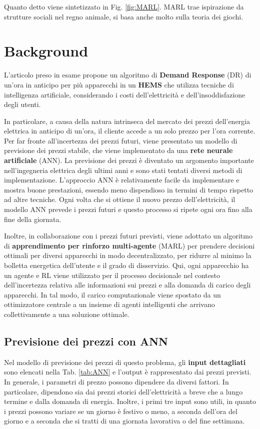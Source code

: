 \documentclass[italian, Lau, oneside]{sapthesis}
\begin{document}
Quanto detto viene sintetizzato in Fig. \ref{fig:MARL}. MARL trae ispirazione da strutture sociali nel regno animale, si basa anche molto sulla teoria dei giochi. 



\chapter{Background}
\label{cap:3}
L'articolo preso in esame \cite{ref:article} propone un algoritmo di \textbf{Demand Response} (DR) di un'ora in anticipo per più apparecchi in un \textbf{HEMS} che utilizza tecniche di intelligenza artificiale, considerando i costi dell'elettricità e dell'insoddisfazione degli utenti.

In particolare, a causa della natura intrinseca del mercato dei prezzi dell'energia elettrica in anticipo di un'ora, il cliente accede a un solo prezzo per l'ora corrente. Per far fronte all'incertezza dei prezzi futuri, viene presentato un modello di previsione dei prezzi stabile, che viene implementato da una \textbf{rete neurale artificiale} (ANN). La previsione dei prezzi è diventato un argomento importante nell'ingegneria elettrica degli ultimi anni e sono stati tentati diversi metodi di implementazione. L'approccio ANN è relativamente facile da implementare e mostra buone prestazioni, essendo meno dispendioso in termini di tempo rispetto ad altre tecniche. Ogni volta che si ottiene il nuovo prezzo dell'elettricità, il modello ANN prevede i prezzi futuri e questo processo si ripete ogni ora fino alla fine della giornata. 

Inoltre, in collaborazione con i prezzi futuri previsti, viene adottato un algoritmo di \textbf{apprendimento per rinforzo multi-agente} (MARL) per prendere decisioni ottimali per diversi apparecchi in modo decentralizzato, per ridurre al minimo la bolletta energetica dell'utente e il grado di disservizio. Qui, ogni apparecchio ha un agente e RL viene utilizzato per il processo decisionale nel contesto dell'incertezza relativa alle informazioni sui prezzi e alla domanda di carico degli apparecchi. In tal modo, il carico computazionale viene spostato da un ottimizzatore centrale a un insieme di agenti intelligenti che arrivano collettivamente a una soluzione ottimale. 

\section{Previsione dei prezzi con ANN}
Nel modello di previsione dei prezzi di questo problema, gli \textbf{input dettagliati} sono elencati nella Tab. \ref{tab:ANN} e l'output è rappresentato dai prezzi previsti. In generale, i parametri di prezzo possono dipendere da diversi fattori. In particolare, dipendono sia dai prezzi storici dell'elettricità a breve che a lungo termine e dalla domanda di energia. Inoltre, i primi tre input sono utili, in quanto i prezzi possono variare se un giorno è festivo o meno, a seconda dell'ora del giorno e a seconda che si tratti di una giornata lavorativa o del fine settimana.
\end{document}
